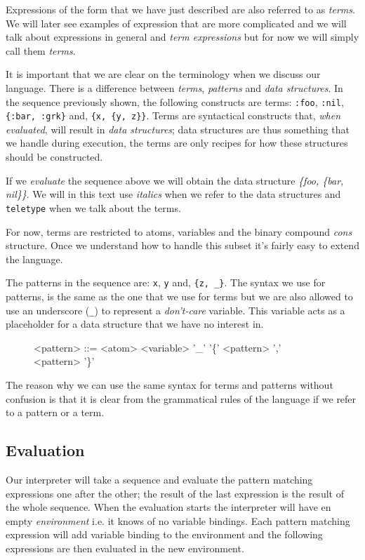 \documentclass[a4paper,11pt]{article}
\begin{document}
Expressions of the form that we have just described are also referred
to as {\em terms}. We will later see examples of expression that are
more complicated and we will talk about expressions in general and
{\em term expressions} but for now we will simply call them {\em terms}.

It is important that we are clear on the terminology when we discuss
our language. There is a difference between {\em terms}, {\em
  patterns} and {\em data structures}. In the sequence previously
shown, the following constructs are terms: \verb+:foo+, \verb+:nil+,
\verb+{:bar, :grk}+ and, \verb+{x, {y, z}}+. Terms are syntactical
constructs that, {\em when evaluated}, will result in {\em data
  structures}; data structures are thus something that we handle
during execution, the terms are only recipes for how these structures
should be constructed.

If we {\em evaluate} the sequence above we will obtain the data
structure \textit{ \{foo, \{bar, nil\}\}}. We will in this
text use {\it italics} when we refer to the data structures and
\verb+teletype+ when we talk about the terms.

For now, terms are restricted to atoms, variables and the binary
compound {\em cons} structure. Once we understand how to handle this
subset it's fairly easy to extend the language.

The patterns in the sequence are: \verb+x+, \verb+y+ and,
\verb+{z, _}+. The syntax we use for patterns, is the same as the one
that we use for terms but we are also allowed to use an underscore
(\verb+_+) to represent a {\em don't-care} variable. This variable
acts as a placeholder for a data structure that we have no interest
in.

\begin{figure}[h]
\begin{grammar}
<pattern> ::= <atom>
\alt <variable>
\alt '_'  
\alt '\{' <pattern> ',' <pattern> '\}'
\end{grammar}
\end{figure}

The reason why we can use the same syntax for terms and patterns
without confusion is that it is clear from the grammatical rules of the
language if we refer to a pattern or a term. 

\subsection{Evaluation}

Our interpreter will take a sequence and evaluate the pattern matching
expressions one after the other; the result of the last expression is
the result of the whole sequence. When the evaluation starts the
interpreter will have en empty {\em environment} i.e. it knows of no
variable bindings. Each pattern matching expression will add variable
binding to the environment and the following expressions are then
evaluated in the new environment.
 
\end{document}
